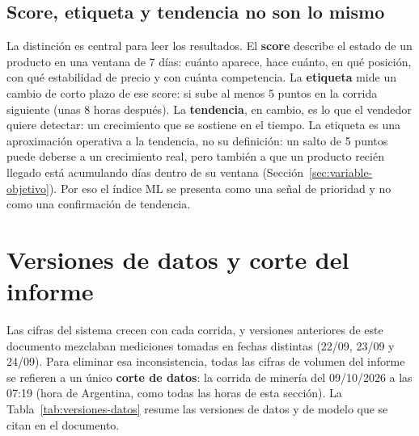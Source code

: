 \subsection*{Score, etiqueta y tendencia no son lo mismo}

La distinción es central para leer los resultados. El \textbf{score} describe el estado de un producto en una ventana de 7 días: cuánto aparece, hace cuánto, en qué posición, con qué estabilidad de precio y con cuánta competencia. La \textbf{etiqueta} mide un cambio de corto plazo de ese score: si sube al menos 5 puntos en la corrida siguiente (unas 8 horas después). La \textbf{tendencia}, en cambio, es lo que el vendedor quiere detectar: un crecimiento que se sostiene en el tiempo. La etiqueta es una aproximación operativa a la tendencia, no su definición: un salto de 5 puntos puede deberse a un crecimiento real, pero también a que un producto recién llegado está acumulando días dentro de su ventana (Sección~\ref{sec:variable-objetivo}). Por eso el índice ML se presenta como una señal de prioridad y no como una confirmación de tendencia.

\section{Versiones de datos y corte del informe}\label{sec:versiones-datos}

Las cifras del sistema crecen con cada corrida, y versiones anteriores de este documento mezclaban mediciones tomadas en fechas distintas (22/09, 23/09 y 24/09). Para eliminar esa inconsistencia, todas las cifras de volumen del informe se refieren a un único \textbf{corte de datos}: la corrida de minería del 09/10/2026 a las 07:19 (hora de Argentina, como todas las horas de esta sección). La Tabla~\ref{tab:versiones-datos} resume las versiones de datos y de modelo que se citan en el documento.

